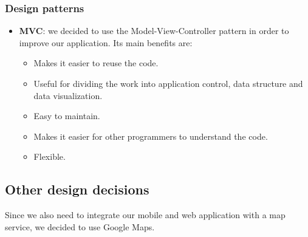 \subsubsection{Design patterns}
\begin{itemize}
	\item \textbf{MVC}: we decided to use the Model-View-Controller pattern in order to improve our application. Its main benefits are:
	\begin{itemize}
		\item Makes it easier to reuse the code.
		\item Useful for dividing the work into application control, data structure and data visualization.
		\item Easy to maintain.
		\item Makes it easier for other programmers to understand the code.
		\item Flexible.
	\end{itemize}
\end{itemize}   
\subsection{Other design decisions} 
Since we also need to integrate our mobile and web application with a map service, we decided to use Google Maps.